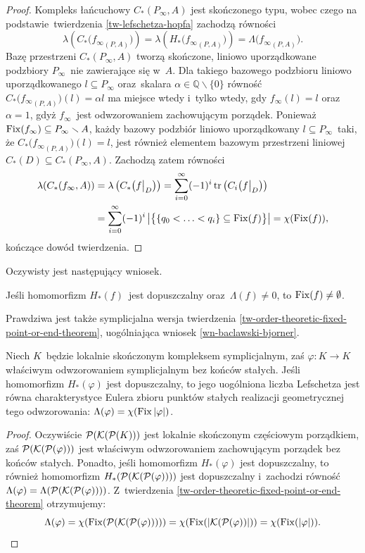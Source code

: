 \begin{proof}
Kompleks łańcuchowy $C_*(P_\infty,A)$ jest skończonego typu, wobec czego na podstawie~twierdzenia \ref{tw-lefschetza-hopfa} zachodzą równości \[\lambda\left(C_*\bigl({f_\infty}_{(P,A)}\bigr)\right)=\lambda\left(H_*\bigl({f_\infty}_{(P,A)}\bigr)\right)=\Lambda\bigl({f_\infty}_{(P,A)}\bigr).\] Bazę przestrzeni $C_*(P_\infty,A)$ tworzą skończone, liniowo uporządkowane podzbiory $P_\infty$~nie zawierające się w~$A$. Dla takiego bazowego podzbioru liniowo uporządkowanego $l\subseteq P_\infty$ oraz~skalara $\alpha\in\mathbb{Q}\smallsetminus \{0\}$ równość $C_*\bigl({f_\infty}_{(P,A)}\bigr)(l)=\alpha l$ ma miejsce wtedy i~tylko wtedy, gdy $f_\infty(l)=l$ oraz $\alpha=1$, gdyż $f_\infty$~jest odwzorowaniem zachowującym porządek. Ponieważ $\operatorname{Fix}(f_\infty)\subseteq P_\infty\smallsetminus A$, każdy bazowy podzbiór liniowo uporządkowany $l\subseteq P_\infty$~taki, że $C_*\bigl({f_\infty}_{(P,A)}\bigr)(l)=l$, jest również elementem bazowym przestrzeni liniowej $C_*(D)\subseteq C_*(P_\infty,A)$. Zachodzą  zatem równości \begin{align*}\lambda(C_*(f_\infty,A))&=\lambda\left(C_*\bigl(f\big |_D\bigr)\right)=\sum_{i=0}^{\infty}(-1)^i\operatorname{tr}\left(C_i\bigl(f\big|_D\bigr)\right)\\&=\sum_{i=0}^{\infty}(-1)^{i}\left|\bigl\{\{q_0<\ldots<q_i\}\subseteq \operatorname{Fix}(f)\bigr\}\right| =\chi(\operatorname{Fix}(f)),\end{align*}
kończące dowód twierdzenia. 
\end{proof}

Oczywisty jest następujący wniosek.
\begin{wn}
Jeśli homomorfizm $H_*(f)$~jest dopuszczalny oraz~$\Lambda(f)\not=0$, to $\operatorname{Fix}(f)\not=\emptyset$.
\end{wn}

Prawdziwa jest także symplicjalna wersja twierdzenia \ref{tw-order-theoretic-fixed-point-or-end-theorem}, uogólniająca wniosek \ref{wn-baclawski-bjorner}.

\begin{wn}\label{wn-simplicial-fixed-point-or-end-theorem}
Niech $K$~będzie lokalnie skończonym kompleksem symplicjalnym, zaś $\varphi\colon K\to K$ właściwym odwzorowaniem symplicjalnym bez końców stałych. Jeśli homomorfizm $H_*(\varphi)$ jest dopuszczalny, to jego uogólniona liczba Lefschetza jest równa charakterystyce Eulera zbioru punktów stałych realizacji geometrycznej tego odwzorowania: $\Lambda(\varphi)=\chi(\operatorname{Fix}|\varphi|)$. 
\end{wn}
\begin{proof}
Oczywiście $\mathcal{P}(\mathcal{K}(\mathcal{P}(K)))$ jest lokalnie skończonym częściowym porządkiem, zaś $\mathcal{P}(\mathcal{K}(\mathcal{P}(\varphi)))$ jest właściwym odwzorowaniem zachowującym porządek bez końców stałych. Ponadto, jeśli homomorfizm $H_*(\varphi)$ jest dopuszczalny, to również homomorfizm $H_*(\mathcal{P}(\mathcal{K}(\mathcal{P}(\varphi))))$ jest dopuszczalny i~zachodzi równość $\Lambda(\varphi)=\Lambda(\mathcal{P}(\mathcal{K}(\mathcal{P}(\varphi))))$. Z~twierdzenia \ref{tw-order-theoretic-fixed-point-or-end-theorem} otrzymujemy: \[\Lambda(\varphi)=\chi(\operatorname{Fix}(\mathcal{P}(\mathcal{K}(\mathcal{P}(\varphi)))))=\chi(\operatorname{Fix}(|\mathcal{K}(\mathcal{P}(\varphi))|))=\chi(\operatorname{Fix}(|\varphi|)).\qedhere\]
\end{proof}

